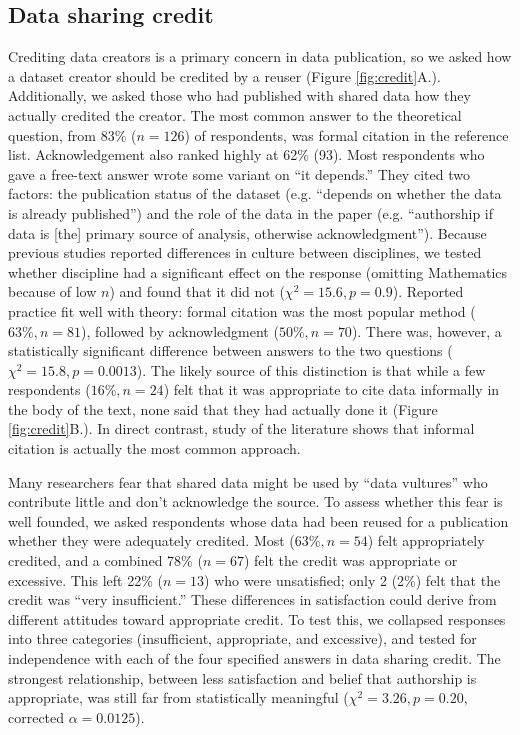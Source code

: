 \documentclass[10pt]{article}
\begin{document}
\subsection*{Data sharing credit}

Crediting data creators is a primary concern in data publication, so we asked how a dataset creator should be credited by a reuser (Figure \ref{fig:credit}A.).
Additionally, we asked those who had published with shared data how they actually credited the creator.
The most common answer to the theoretical question, from 83\% ($n=126$) of respondents, was formal citation in the reference list.
Acknowledgement also ranked highly at 62\% (93).
Most respondents who gave a free-text answer wrote some variant on ``it depends.''
They cited two factors: the publication status of the dataset (e.g. ``depends on whether the data is already published'') and the role of the data in the paper (e.g. ``authorship if data is [the] primary source of analysis, otherwise acknowledgment'').
Because previous studies reported differences in culture between disciplines\cite{swan_share_2008, harley_assessing_2010, tenopir_data_2011}, we tested whether discipline had a significant effect on the response  (omitting Mathematics because of low $n$) and found that it did not ($\chi^{2}=15.6, p=0.9$).
Reported practice fit well with theory: formal citation was the most popular method ($63\%, n=81$), followed by acknowledgment ($50\%, n=70$).
There was, however, a statistically significant difference between answers to the two questions ($\chi^{2}=15.8, p=0.0013$).
The likely source of this distinction is that while a few respondents ($16\%, n=24$) felt that it was appropriate to cite data informally in the body of the text, none said that they had actually done it (Figure \ref{fig:credit}B.).
In direct contrast, study of the literature shows that informal citation is actually the most common approach\cite{sieber_not_1995, mooney_anatomy_2012}.

Many researchers fear that shared data might be used by ``data vultures'' who contribute little and don't acknowledge the source\cite{kim_institutional_2012}.
To assess whether this fear is well founded, we asked respondents whose data had been reused for a publication whether they were adequately credited.
Most ($63\%, n=54$) felt appropriately credited, and a combined 78\% ($n=67$) felt the credit was appropriate or excessive.
This left 22\% ($n=13$) who were unsatisfied; only 2 (2\%) felt that the credit was ``very insufficient.''
These differences in satisfaction could derive from different attitudes toward appropriate credit.  
To test this, we collapsed responses into three categories (insufficient, appropriate, and excessive), and tested for independence with each of the four specified answers in data sharing credit.
The strongest relationship, between less satisfaction and belief that authorship is appropriate, was still far from statistically meaningful ($\chi^{2}= 3.26, p= 0.20$, corrected $\alpha= 0.0125$).
\end{document}
